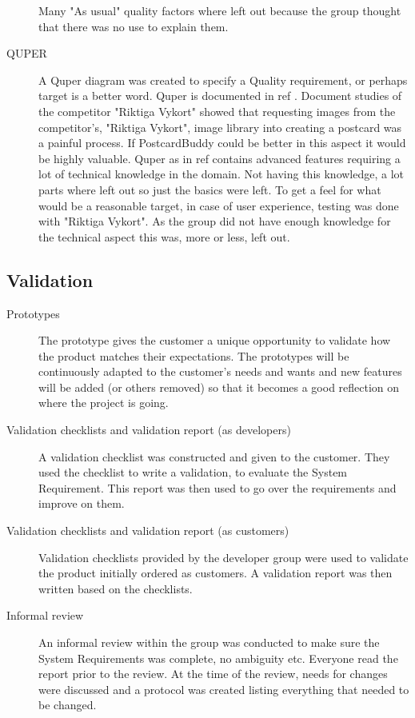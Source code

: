 \documentclass[10pt,a4paper]{article}
\begin{document}
\begin{description}
Many "As usual" quality factors where left out because the group thought that there was no use to explain them.

\item[QUPER]
A Quper diagram was created to specify a Quality requirement, or perhaps target is a better word. Quper is documented in ref \cite{soren}. Document studies of the competitor "Riktiga Vykort" showed that requesting images from the competitor's, "Riktiga Vykort", image library into creating a postcard was a painful process. If PostcardBuddy could be better in this aspect it would be highly valuable. Quper as in ref \cite{soren} contains advanced features requiring a lot of technical knowledge in the domain. Not having this knowledge, a lot parts where left out so just the basics were left. To get a feel for what would be a reasonable target, in case of user experience, testing was done with "Riktiga Vykort". As the group did not have enough knowledge for the technical aspect this was, more or less, left out.



\end{description}

\subsection{Validation}
\begin{description}
\item[Prototypes] The prototype gives the customer a unique opportunity to validate how the product matches their expectations. The prototypes will be continuously adapted to the customer's needs and wants and new features will be added (or others removed) so that it becomes a good reflection on where the project is going. 

\item[Validation checklists and validation report (as developers)] A validation checklist was constructed and given to the customer. They used the checklist to write a validation, to evaluate the System Requirement. This report was then used to go over the requirements and improve on them.

\item[Validation checklists and validation report (as customers)] Validation checklists provided by the developer group were used to validate the product initially ordered as customers. A validation report was then written based on the checklists.

\item[Informal review] An informal review within the group was conducted to make sure the System Requirements was complete, no ambiguity etc. Everyone read the report prior to the review. At the time of the review, needs for changes were discussed and a protocol was created listing everything that needed to be changed.

 
\end{description}
\end{document}
